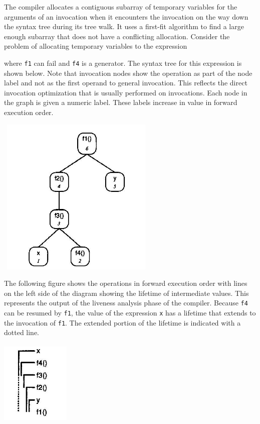 The compiler allocates a contiguous subarray of temporary variables
for the arguments of an invocation when it encounters the invocation
on the way down the syntax tree during its tree walk. It uses a
first-fit algorithm to find a large enough subarray that does not have
a conflicting allocation. Consider the problem of allocating temporary
variables to the expression


\noindent where \texttt{f1} can fail and \texttt{f4} is a
generator. The syntax tree for this expression is shown below. Note
that invocation nodes show the operation as part of the node label and
not as the first operand to general invocation. This reflects the
direct invocation optimization that is usually performed on
invocations. Each node in the graph is given a numeric label. These
labels increase in value in forward execution order.

{\centering{}
\includegraphics[width=3.0in,height=3.0in]{kw/figure8-1.png}
\par}

The following figure shows the operations in forward execution order
with lines on the left side of the diagram showing the lifetime of
intermediate values. This represents the output of the liveness
analysis phase of the compiler. Because \texttt{f4} can be resumed by
\texttt{f1}, the value of the expression \texttt{x} has a lifetime
that extends to the invocation of \texttt{f1}. The extended portion of
the lifetime is indicated with a dotted line.

{\centering{}
\includegraphics[width=1.3in,height=1.6in]{kw/figure8-2.png}
\par}


